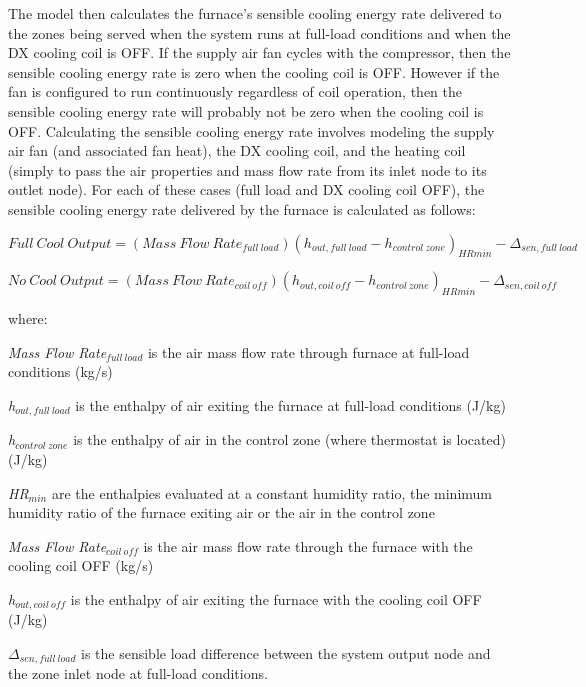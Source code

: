 The model then calculates the furnace's sensible cooling energy rate delivered to the zones being served when the system runs at full-load conditions and when the DX cooling coil is OFF. If the supply air fan cycles with the compressor, then the sensible cooling energy rate is zero when the cooling coil is OFF. However if the fan is configured to run continuously regardless of coil operation, then the sensible cooling energy rate will probably not be zero when the cooling coil is OFF. Calculating the sensible cooling energy rate involves modeling the supply air fan (and associated fan heat), the DX cooling coil, and the heating coil (simply to pass the air properties and mass flow rate from its inlet node to its outlet node). For each of these cases (full load and DX cooling coil OFF), the sensible cooling energy rate delivered by the furnace is calculated as follows:

\begin{equation}
Full~Cool~Output = (Mass~Flow~Rat{e_{full~load}}){({h_{out,full~load}} - {h_{control~zone}})_{HRmin}} - {\Delta_{sen,full~load}}
\end{equation}

\begin{equation}
No~Cool~Output = (Mass~Flow~Rat{e_{coil~off}}){({h_{out,coil~off}} - {h_{control~zone}})_{HRmin}} - {\Delta_{sen,coil~off}}
\end{equation}

where:

\emph{Mass Flow Rate\(_{full~load}\)} is the air mass flow rate through furnace at full-load conditions (kg/s)

\emph{h\(_{out,full~load}\)} is the enthalpy of air exiting the furnace at full-load conditions (J/kg)

\emph{h\(_{control~zone}\)} is the enthalpy of air in the control zone (where thermostat is located) (J/kg)

\emph{HR\(_{min}\)} are the enthalpies evaluated at a constant humidity ratio, the minimum humidity ratio of the furnace exiting air or the air in the control zone

\emph{Mass Flow Rate\(_{coil~off}\)} is the air mass flow rate through the furnace with the cooling coil OFF (kg/s)

\emph{h\(_{out,coil~off}\)} is the enthalpy of air exiting the furnace with the cooling coil OFF (J/kg)

\(\Delta_{sen,full~load}\) is the sensible load difference between the system output node and the zone inlet node at full-load conditions.

